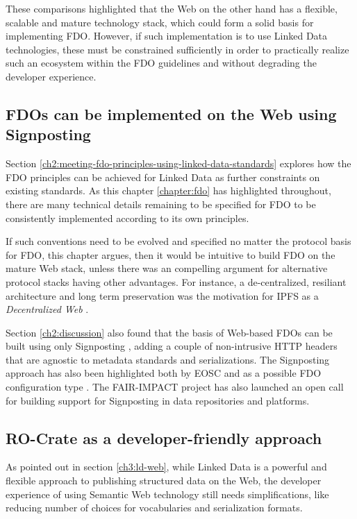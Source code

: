These comparisons highlighted that the Web on the other hand has a flexible, scalable and mature technology stack, which could form a solid basis for implementing FDO. 
However, if such implementation is to use Linked Data technologies, these must be constrained sufficiently in order to practically realize such an ecosystem within the FDO guidelines and without degrading the developer experience.


\subsection{FDOs can be implemented on the Web using Signposting}

Section \vref{ch2:meeting-fdo-principles-using-linked-data-standards} explores how the FDO principles can be achieved for Linked Data as further constraints on existing standards. As this chapter \vref{chapter:fdo} has highlighted throughout, there are many technical details remaining to be specified for FDO to be consistently implemented according to its own principles.

If such conventions need to be evolved and specified no matter the protocol basis for FDO, this chapter argues, then it would be intuitive to build FDO on the mature Web stack, unless there was an compelling argument for alternative protocol stacks having other advantages. For instance, a de-centralized, resiliant architecture and long term preservation was the motivation for IPFS as a \emph{Decentralized Web} \cite{Trautwein 2022}.

Section \ref{ch2:discussion} also found that the basis of Web-based FDOs can be built using only Signposting \cite{vandesompel2015,Van de Sompel 2022}, adding a couple of non-intrusive HTTP headers that are agnostic to metadata standards and serializations. 
The Signposting approach has also been highlighted both by EOSC \cite{10.5281/zenodo.7463421} and as a possible FDO configuration type \cite{fdo-ConfigurationTypes}. The FAIR-IMPACT project has also launched an open call for building support for Signposting \cite{soilandreyes2023b} in data repositories and platforms.



\subsection{RO-Crate as a developer-friendly approach}

As pointed out in section \vref{ch3:ld-web}, while Linked Data is a powerful and flexible approach to publishing structured data on the Web, the developer experience of using Semantic Web technology still needs simplifications, like reducing number of choices for vocabularies and serialization formats. 

